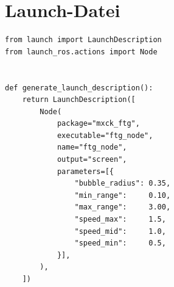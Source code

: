 \section{Launch-Datei}
\label{sec:launch}

\begin{lstlisting}[language=Python3,
                   caption={Launch-Datei \texttt{ftg\_launch.py}},
                   label={lst:launch}]
from launch import LaunchDescription
from launch_ros.actions import Node


def generate_launch_description():
    return LaunchDescription([
        Node(
            package="mxck_ftg",
            executable="ftg_node",
            name="ftg_node",
            output="screen",
            parameters=[{
                "bubble_radius": 0.35,
                "min_range":     0.10,
                "max_range":     3.00,
                "speed_max":     1.5,
                "speed_mid":     1.0,
                "speed_min":     0.5,
            }],
        ),
    ])
\end{lstlisting}
